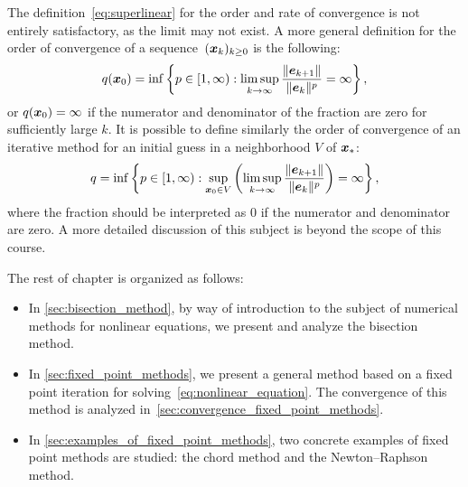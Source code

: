 \begin{remark}
    The definition~\eqref{eq:superlinear} for the order and rate of convergence is not entirely satisfactory,
    as the limit may not exist.
    A more general definition for the order of convergence of a sequence~$(\mathbf{\boldsymbol{x}}_k)_{k\geq0}$ is the following:
    \[
        q(\mathbf{\boldsymbol{x}}_0) = \inf \left\{ p \in [1, \infty) : \limsup_{k \to \infty} \frac{\lVert\mathbf{\boldsymbol{e}}_{k+1}\rVert}{\lVert\mathbf{\boldsymbol{e}}_k\rVert^p} = \infty \right\},
    \]
    or $q(\mathbf{\boldsymbol{x}}_0) = \infty$ if the numerator and denominator of the fraction are zero for sufficiently large $k$.
    It is possible to define similarly the order of convergence of an iterative method
    for an initial guess in a neighborhood $V$ of $\mathbf{\boldsymbol{x}}_*$:
    \[
        q = \inf \left\{ p \in [1, \infty) : \sup_{\mathbf{\boldsymbol{x}}_0 \in V} \left( \limsup_{k \to \infty} \frac{\lVert\mathbf{\boldsymbol{e}}_{k+1}\rVert}{\lVert\mathbf{\boldsymbol{e}}_k\rVert^p} \right) = \infty \right\},
    \]
    where the fraction should be interpreted as 0 if the numerator and denominator are zero.
    A more detailed discussion of this subject is beyond the scope of this course.
\end{remark}

The rest of chapter is organized as follows:
\begin{itemize}
    \item 
        In \cref{sec:bisection_method},
        by way of introduction to the subject of numerical methods for nonlinear equations,
        we present and analyze the bisection method.

    \item
        In \cref{sec:fixed_point_methods},
        we present a general method based on a fixed point iteration for solving~\eqref{eq:nonlinear_equation}.
        The convergence of this method is analyzed in~\cref{sec:convergence_fixed_point_methods}.

    \item
        In \cref{sec:examples_of_fixed_point_methods},
        two concrete examples of fixed point methods are studied:
        the chord method and the Newton--Raphson method.
\end{itemize}

